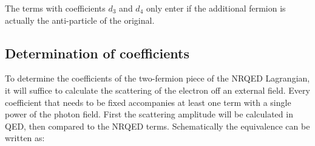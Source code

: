 The terms with coefficients $d_3$ and $d_4$ only enter if the additional fermion is actually the anti-particle of the original.  
		

\subsection{Determination of coefficients}

To determine the coefficients of the two-fermion piece of the NRQED Lagrangian, it will suffice to calculate the scattering of the electron off an external field.  Every coefficient that needs to be fixed accompanies at least one term with a single power of the photon field.  First the scattering amplitude will be calculated in QED, then compared to the NRQED terms.  Schematically the equivalence can be written as:

